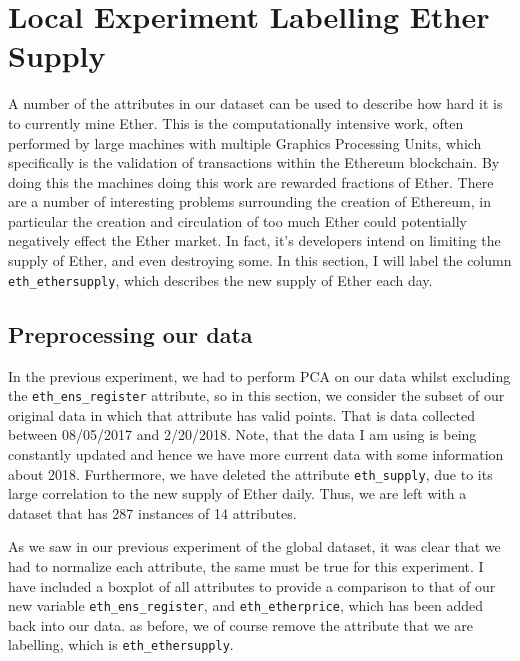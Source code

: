 \documentclass{article}
\begin{document}
\section{Local Experiment Labelling Ether Supply}
A number of the attributes in our dataset can be used to describe how hard it is to currently mine Ether. This is the computationally intensive work, often performed by large machines with multiple Graphics Processing Units, which specifically is the validation of transactions within the Ethereum blockchain. By doing this the machines doing this work are rewarded fractions of Ether\cite{ethereum_info}. There are a number of interesting problems surrounding the creation of Ethereum, in particular the creation and circulation of too much Ether could potentially negatively effect the Ether market. In fact, it's developers intend on limiting the supply of Ether, and even destroying some. In this section, I will label the column \texttt{eth\_ethersupply}, which describes the new supply of Ether each day. 


\subsection{Preprocessing our data}
In the previous experiment, we had to perform PCA on our data whilst excluding the \texttt{eth\_ens\_register} attribute, so in this section, we consider the subset of our original data in which that attribute has valid points. That is data collected between 08/05/2017 and 2/20/2018. Note, that the data I am using is being constantly updated and hence we have more current data with some information about 2018. Furthermore, we have deleted the attribute \texttt{eth\_supply}, due to its large correlation to the new supply of Ether daily. Thus, we are left with a dataset that has 287 instances of 14 attributes. 

As we saw in our previous experiment of the global dataset, it was clear that we had to normalize each attribute, the same must be true for this experiment. I have included a boxplot of all attributes to provide a comparison to that of our new variable \texttt{eth\_ens\_register}, and \texttt{eth\_etherprice}, which has been added back into our data. as before, we of course remove the attribute that we are labelling, which is \texttt{eth\_ethersupply}.
\end{document}
